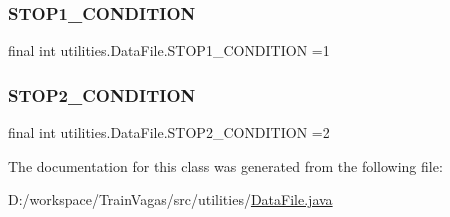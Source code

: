 \subsubsection{\texorpdfstring{S\+T\+O\+P1\+\_\+\+C\+O\+N\+D\+I\+T\+I\+ON}{STOP1\_CONDITION}}
{\footnotesize\ttfamily final int utilities.\+Data\+File.\+S\+T\+O\+P1\+\_\+\+C\+O\+N\+D\+I\+T\+I\+ON =1\hspace{0.3cm}{\ttfamily [static]}}

\mbox{\label{classutilities_1_1_data_file_afdb877fcbb93d5bf2e6757f844c0a0e0}} 
\subsubsection{\texorpdfstring{S\+T\+O\+P2\+\_\+\+C\+O\+N\+D\+I\+T\+I\+ON}{STOP2\_CONDITION}}
{\footnotesize\ttfamily final int utilities.\+Data\+File.\+S\+T\+O\+P2\+\_\+\+C\+O\+N\+D\+I\+T\+I\+ON =2\hspace{0.3cm}{\ttfamily [static]}}



The documentation for this class was generated from the following file\+:\begin{DoxyCompactItemize}
\item 
D\+:/workspace/\+Train\+Vagas/src/utilities/\hyperlink{_data_file_8java}{Data\+File.\+java}\end{DoxyCompactItemize}
